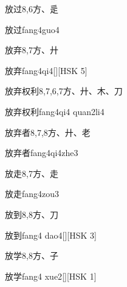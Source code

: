 \begin{entry}{放过}{8,6}{⽅、⾡}
  \begin{phonetics}{放过}{fang4guo4}
  \end{phonetics}
\end{entry}

\begin{entry}{放弃}{8,7}{⽅、⼶}
  \begin{phonetics}{放弃}{fang4qi4}[][HSK 5]
  \end{phonetics}
\end{entry}

\begin{entry}{放弃权利}{8,7,6,7}{⽅、⼶、⽊、⼑}
  \begin{phonetics}{放弃权利}{fang4qi4 quan2li4}
  \end{phonetics}
\end{entry}

\begin{entry}{放弃者}{8,7,8}{⽅、⼶、⽼}
  \begin{phonetics}{放弃者}{fang4qi4zhe3}
  \end{phonetics}
\end{entry}

\begin{entry}{放走}{8,7}{⽅、⾛}
  \begin{phonetics}{放走}{fang4zou3}
  \end{phonetics}
\end{entry}

\begin{entry}{放到}{8,8}{⽅、⼑}
  \begin{phonetics}{放到}{fang4 dao4}[][HSK 3]
  \end{phonetics}
\end{entry}

\begin{entry}{放学}{8,8}{⽅、⼦}
  \begin{phonetics}{放学}{fang4 xue2}[][HSK 1]
  \end{phonetics}
\end{entry}

